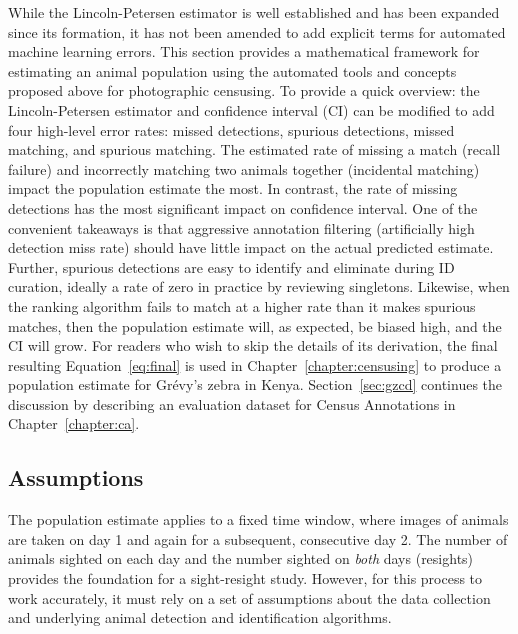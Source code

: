 While the Lincoln-Petersen estimator is well established and has been expanded since its formation, it has not been amended to add explicit terms for automated machine learning errors.  This section provides a mathematical framework for estimating an animal population using the automated tools and concepts proposed above for photographic censusing.  To provide a quick overview: the Lincoln-Petersen estimator and confidence interval (CI) can be modified to add four high-level error rates: missed detections, spurious detections, missed matching, and spurious matching.  The estimated rate of missing a match (recall failure) and incorrectly matching two animals together (incidental matching) impact the population estimate the most. In contrast, the rate of missing detections has the most significant impact on confidence interval.  One of the convenient takeaways is that aggressive annotation filtering (artificially high detection miss rate) should have little impact on the actual predicted estimate.  Further, spurious detections are easy to identify and eliminate during ID curation, ideally a rate of zero in practice by reviewing singletons.  Likewise, when the ranking algorithm fails to match at a higher rate than it makes spurious matches, then the population estimate will, as expected, be biased high, and the CI will grow.  For readers who wish to skip the details of its derivation, the final resulting Equation~\ref{eq:final} is used in Chapter~\ref{chapter:censusing} to produce a population estimate for Gr\'evy's zebra in Kenya.  Section~\ref{sec:gzcd} continues the discussion by describing an evaluation dataset for Census Annotations in Chapter~\ref{chapter:ca}.

\subsection{Assumptions} \label{sec:assumptions}

The population estimate applies to a fixed time window, where images of animals are taken on day 1 and again for a subsequent, consecutive day 2.  The number of animals sighted on each day and the number sighted on {\it both} days (resights) provides the foundation for a sight-resight study. However, for this process to work accurately, it must rely on a set of assumptions about the data collection and underlying animal detection and identification algorithms.

